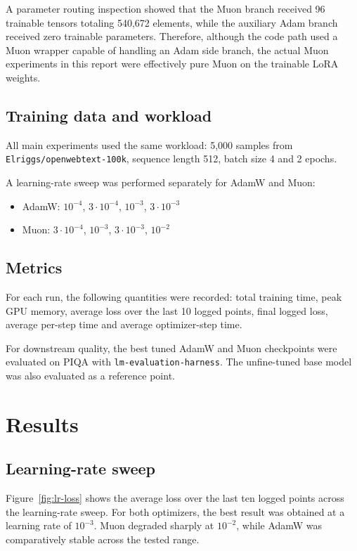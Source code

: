 \documentclass[11pt]{article}
\begin{document}
A parameter routing inspection showed that the Muon branch received 96 trainable tensors totaling 540,672 elements, while the auxiliary Adam branch received zero trainable parameters.
Therefore, although the code path used a Muon wrapper capable of handling an Adam side branch, the actual Muon experiments in this report were effectively pure Muon on the trainable LoRA weights.

\subsection{Training data and workload}
All main experiments used the same workload:
    5,000 samples from \texttt{Elriggs/openwebtext-100k}, sequence length 512, batch size 4 and 2 epochs.


A learning-rate sweep was performed separately for AdamW and Muon:
\begin{itemize}[leftmargin=1.5em]
    \item AdamW: $10^{-4}$, $3 \cdot 10^{-4}$, $10^{-3}$, $3 \cdot 10^{-3}$
    \item Muon: $3 \cdot 10^{-4}$, $10^{-3}$, $3 \cdot 10^{-3}$, $10^{-2}$
\end{itemize}

\subsection{Metrics}
For each run, the following quantities were recorded:
    total training time, peak GPU memory, average loss over the last 10 logged points, final logged loss, average per-step time and average optimizer-step time.

For downstream quality, the best tuned AdamW and Muon checkpoints were evaluated on PIQA with \texttt{lm-evaluation-harness}.
The unfine-tuned base model was also evaluated as a reference point.

\section{Results}
\subsection{Learning-rate sweep}
Figure~\ref{fig:lr-loss} shows the average loss over the last ten logged points across the learning-rate sweep.
For both optimizers, the best result was obtained at a learning rate of $10^{-3}$.
Muon degraded sharply at $10^{-2}$, while AdamW was comparatively stable across the tested range.
\end{document}
